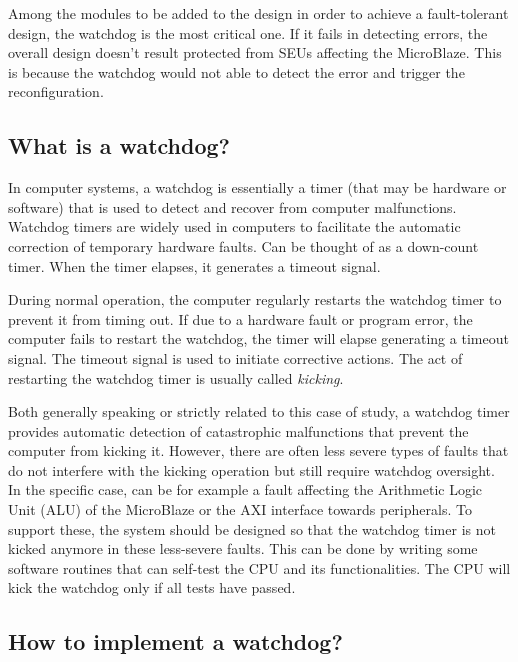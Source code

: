 Among the modules to be added to the design in order to achieve a fault-tolerant design, the watchdog is the most critical one. If it fails in detecting errors, the overall design doesn't result protected from SEUs affecting the MicroBlaze. This is because the watchdog would not able to detect the error and trigger the reconfiguration. 

\subsection{What is a watchdog?}

In computer systems, a watchdog is essentially a timer (that may be hardware or software) that is used to detect and recover from computer malfunctions. Watchdog timers are widely used in computers to facilitate the automatic correction of temporary hardware faults. Can be thought of as a down-count timer. When the timer elapses, it generates a timeout signal.\bigskip

During normal operation, the computer regularly restarts the watchdog timer to prevent it from timing out. If due to a hardware fault or program error, the computer fails to restart the watchdog, the timer will elapse generating a timeout signal. The timeout signal is used to initiate corrective actions. The act of restarting the watchdog timer is usually called \textit{kicking}. \bigskip

Both generally speaking or strictly related to this case of study, a watchdog timer provides automatic detection of catastrophic malfunctions that prevent the computer from kicking it. However, there are often less severe types of faults that do not interfere with the kicking operation but still require watchdog oversight. In the specific case, can be for example a fault affecting the Arithmetic Logic Unit (ALU) of the MicroBlaze or the AXI interface towards peripherals. To support these, the system should be designed so that the watchdog timer is not kicked anymore in these less-severe faults. This can be done by writing some software routines that can self-test the CPU and its functionalities. The CPU will kick the watchdog only if all tests have passed.


\subsection{How to implement a watchdog?}
\label{sec:wd_impl}

